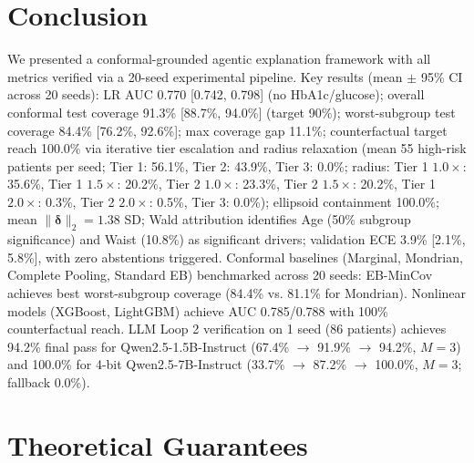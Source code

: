 \documentclass[11pt,a4paper]{article}
\theoremstyle{plain}
\begin{document}
\section{Conclusion}

We presented a conformal-grounded agentic explanation framework with all metrics verified via a 20-seed experimental pipeline. Key results (mean $\pm$ 95\% CI across 20 seeds): LR AUC 0.770 [0.742, 0.798] (no HbA1c/glucose); overall conformal test coverage 91.3\% [88.7\%, 94.0\%] (target 90\%); worst-subgroup test coverage 84.4\% [76.2\%, 92.6\%]; max coverage gap 11.1\%; counterfactual target reach 100.0\% via iterative tier escalation and radius relaxation (mean 55 high-risk patients per seed; Tier 1: 56.1\%, Tier 2: 43.9\%, Tier 3: 0.0\%; radius: Tier 1 $1.0\times$: 35.6\%, Tier 1 $1.5\times$: 20.2\%, Tier 2 $1.0\times$: 23.3\%, Tier 2 $1.5\times$: 20.2\%, Tier 1 $2.0\times$: 0.3\%, Tier 2 $2.0\times$: 0.5\%, Tier 3: 0.0\%); ellipsoid containment 100.0\%; mean $\|\boldsymbol{\delta}\|_2 = 1.38$ SD; Wald attribution identifies Age (50\% subgroup significance) and Waist (10.8\%) as significant drivers; validation ECE 3.9\% [2.1\%, 5.8\%], with zero abstentions triggered. Conformal baselines (Marginal, Mondrian, Complete Pooling, Standard EB) benchmarked across 20 seeds: EB-MinCov achieves best worst-subgroup coverage (84.4\% vs. 81.1\% for Mondrian). Nonlinear models (XGBoost, LightGBM) achieve AUC 0.785/0.788 with 100\% counterfactual reach. %
LLM Loop 2 verification on 1 seed (86 patients) achieves 94.2\% final pass for Qwen2.5-1.5B-Instruct (67.4\% $\to$ 91.9\% $\to$ 94.2\%, $M=3$) and 100.0\% for 4-bit Qwen2.5-7B-Instruct (33.7\% $\to$ 87.2\% $\to$ 100.0\%, $M=3$; fallback 0.0\%).

\appendix

\section{Theoretical Guarantees}
\label{sec:theory}
\end{document}
